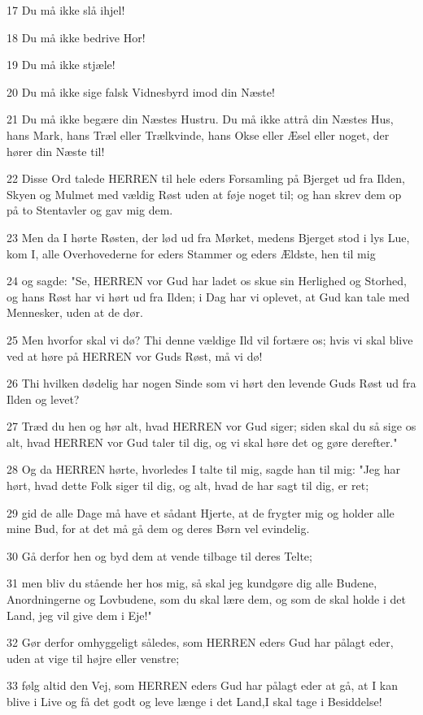 \par 17 Du må ikke slå ihjel!
\par 18 Du må ikke bedrive Hor!
\par 19 Du må ikke stjæle!
\par 20 Du må ikke sige falsk Vidnesbyrd imod din Næste!
\par 21 Du må ikke begære din Næstes Hustru. Du må ikke attrå din Næstes Hus, hans Mark, hans Træl eller Trælkvinde, hans Okse eller Æsel eller noget, der hører din Næste til!
\par 22 Disse Ord talede HERREN til hele eders Forsamling på Bjerget ud fra Ilden, Skyen og Mulmet med vældig Røst uden at føje noget til; og han skrev dem op på to Stentavler og gav mig dem.
\par 23 Men da I hørte Røsten, der lød ud fra Mørket, medens Bjerget stod i lys Lue, kom I, alle Overhovederne for eders Stammer og eders Ældste, hen til mig
\par 24 og sagde: "Se, HERREN vor Gud har ladet os skue sin Herlighed og Storhed, og hans Røst har vi hørt ud fra Ilden; i Dag har vi oplevet, at Gud kan tale med Mennesker, uden at de dør.
\par 25 Men hvorfor skal vi dø? Thi denne vældige Ild vil fortære os; hvis vi skal blive ved at høre på HERREN vor Guds Røst, må vi dø!
\par 26 Thi hvilken dødelig har nogen Sinde som vi hørt den levende Guds Røst ud fra Ilden og levet?
\par 27 Træd du hen og hør alt, hvad HERREN vor Gud siger; siden skal du så sige os alt, hvad HERREN vor Gud taler til dig, og vi skal høre det og gøre derefter."
\par 28 Og da HERREN hørte, hvorledes I talte til mig, sagde han til mig: "Jeg har hørt, hvad dette Folk siger til dig, og alt, hvad de har sagt til dig, er ret;
\par 29 gid de alle Dage må have et sådant Hjerte, at de frygter mig og holder alle mine Bud, for at det må gå dem og deres Børn vel evindelig.
\par 30 Gå derfor hen og byd dem at vende tilbage til deres Telte;
\par 31 men bliv du stående her hos mig, så skal jeg kundgøre dig alle Budene, Anordningerne og Lovbudene, som du skal lære dem, og som de skal holde i det Land, jeg vil give dem i Eje!"
\par 32 Gør derfor omhyggeligt således, som HERREN eders Gud har pålagt eder, uden at vige til højre eller venstre;
\par 33 følg altid den Vej, som HERREN eders Gud har pålagt eder at gå, at I kan blive i Live og få det godt og leve længe i det Land,I skal tage i Besiddelse!

